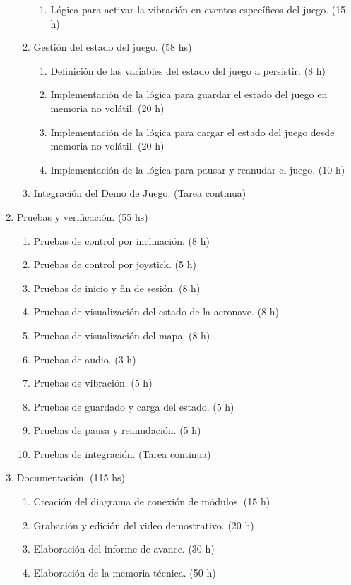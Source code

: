\documentclass[
11pt, %
]{charter}
\begin{document}
\begin{enumerate}
\begin{enumerate}
\begin{enumerate}
			\item Lógica para activar la vibración en eventos específicos del juego. (15 h)
        \end{enumerate}
		\item Gestión del estado del juego. (58 hs)
        \begin{enumerate}
			\item Definición de las variables del estado del juego a persistir. (8 h)
			\item Implementación de la lógica para guardar el estado del juego en memoria no volátil. (20 h)
			\item Implementación de la lógica para cargar el estado del juego desde memoria no volátil. (20 h)
			\item Implementación de la lógica para pausar y reanudar el juego. (10 h)
        \end{enumerate}
		\item Integración del Demo de Juego. (Tarea continua)
    \end{enumerate}
	\item Pruebas y verificación. (55 hs)
    \begin{enumerate}
		\item Pruebas de control por inclinación. (8 h)
		\item Pruebas de control por joystick. (5 h)
		\item Pruebas de inicio y fin de sesión. (8 h)
		\item Pruebas de visualización del estado de la aeronave. (8 h)
		\item Pruebas de visualización del mapa. (8 h)
		\item Pruebas de audio. (3 h)
		\item Pruebas de vibración. (5 h)
		\item Pruebas de guardado y carga del estado. (5 h)
		\item Pruebas de pausa y reanudación. (5 h)
		\item Pruebas de integración. (Tarea continua)
    \end{enumerate}
	\item Documentación. (115 hs)
    \begin{enumerate}
		\item Creación del diagrama de conexión de módulos. (15 h)
		\item Grabación y edición del video demostrativo. (20 h)
		\item Elaboración del informe de avance. (30 h)
		\item Elaboración de la memoria técnica. (50 h)

\end{enumerate}
\end{enumerate}
\end{document}
